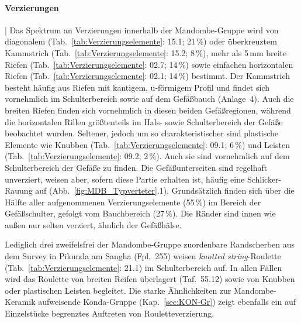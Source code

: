 \paragraph{Verzierungen}\hspace{-.5em}|\hspace{.5em}%
Das Spektrum an Verzierungen innerhalb der Mandombe-Gruppe wird von diagonalem (Tab.~\ref{tab:Verzierungselemente}: 15.1; 21\,\%) oder überkreuztem Kammstrich (Tab.~\ref{tab:Verzierungselemente}: 15.2; 8\,\%), mehr als 5\,mm breite Riefen (Tab.~\ref{tab:Verzierungselemente}: 02.7; 14\,\%) sowie einfachen horizontalen Riefen (Tab.~\ref{tab:Verzierungselemente}: 02.1; 14\,\%) bestimmt. Der Kammstrich besteht häufig aus Riefen mit kantigem, u-förmigem Profil und findet sich vornehmlich im Schulterbereich sowie auf dem Gefäßbauch (Anlage~4). Auch die breiten Riefen finden sich vornehmlich in diesen beiden Gefäßregionen, während die horizontalen Rillen größtenteils im Hals- sowie Schulterbereich der Gefäße beobachtet wurden. Seltener, jedoch um so charakteristischer sind plastische Elemente wie Knubben (Tab.~\ref{tab:Verzierungselemente}: 09.1; 6\,\%) und Leisten (Tab.~\ref{tab:Verzierungselemente}: 09.2; 2\,\%). Auch sie sind vornehmlich auf dem Schulterbereich der Gefäße zu finden. Die Gefäßunterseiten sind regelhaft unverziert, weisen aber, sofern diese Partie erhalten ist, häufig eine Schlicker-Rauung auf (Abb.~\ref{fig:MDB_Typverteter}.1). Grundsätzlich finden sich über die Hälfte aller aufgenommenen Verzierungselemente (55\,\%) im Bereich der Gefäßschulter, gefolgt vom Bauchbereich (27\,\%). Die Ränder sind innen wie außen nur selten verziert, ähnlich der Gefäßhälse.

Lediglich drei zweifelsfrei der Mandombe-Gruppe zuordenbare Randscherben aus dem Survey in Pikunda am \mbox{Sangha} (Fpl.~255) weisen \textit{knotted string}-\mbox{Roulette} (Tab.~\ref{tab:Verzierungselemente}: 21.1) im Schulterbereich auf. In allen Fällen wird das \mbox{Roulette} von breiten Reifen überlagert (Taf.~55.12) sowie von Knubben oder plastischen Leisten begleitet. Die starke Ähnlichkeiten zur Mandombe-Keramik aufweisende Konda-Gruppe (Kap.~\ref{sec:KON-Gr}) zeigt ebenfalls ein auf Einzelstücke begrenztes Auftreten von Rouletteverzierung.

